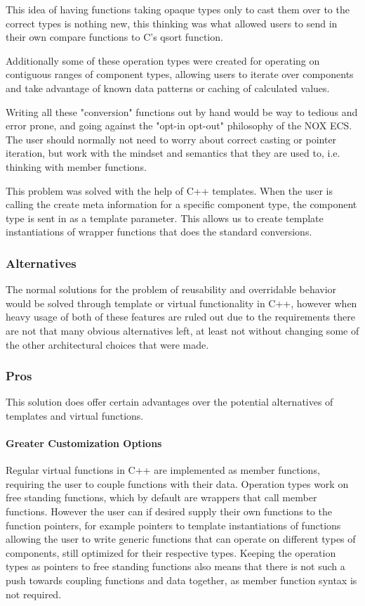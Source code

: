 This idea of having functions taking opaque types only to cast them over to the correct types is nothing new,
this thinking was what allowed users to send in their own compare functions to C's qsort function. 

Additionally some of these operation types were created for operating on contiguous ranges of component types,
allowing users to iterate over components and take advantage of known data patterns or caching of calculated values.

Writing all these "conversion" functions out by hand would be way to tedious and error prone,
and going against the "opt-in opt-out" philosophy of the NOX ECS.
The user should normally not need to worry about correct casting or pointer iteration,
but work with the mindset and semantics that they are used to, i.e. thinking with member functions.

This problem was solved with the help of C++ templates.
When the user is calling the create meta information for a specific component type,
the component type is sent in as a template parameter.
This allows us to create template instantiations of wrapper functions that does the standard conversions.

\subsubsection{Alternatives}
The normal solutions for the problem of reusability and overridable behavior would be solved through template or virtual
functionality in C++, however when heavy usage of both of these features are ruled out due to the requirements there are not that many obvious alternatives left,
at least not without changing some of the other architectural choices that were made.

\subsubsection{Pros}
This solution does offer certain advantages over the potential alternatives of templates and virtual functions.

\paragraph{Greater Customization Options}
Regular virtual functions in C++ are implemented as member functions, requiring the user to couple functions with their data.
Operation types work on free standing functions, which by default are wrappers that call member functions.
However the user can if desired supply their own functions to the function pointers, for example pointers to template
instantiations of functions allowing the user to write generic functions that can operate on different types of components,
still optimized for their respective types.
Keeping the operation types as pointers to free standing functions also means that there is not such a push towards
coupling functions and data together, as member function syntax is not required.

